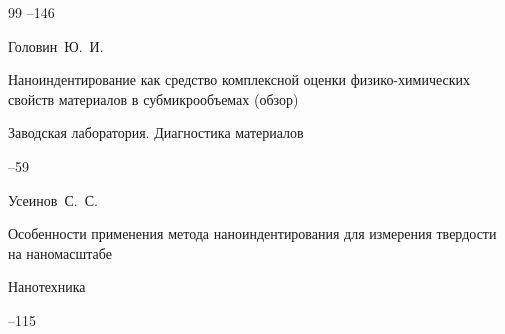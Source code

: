 \begin{thebibliography}{99}
--146















\by Головин~Ю.~И.

\paper Наноиндентирование как средство комплексной оценки физико-химических свойств материалов в субмикрообъемах (обзор)

\jour Заводская лаборатория. Диагностика материалов 




--59















\by Усеинов~С.~С. 

\paper Особенности применения метода наноиндентирования для измерения твердости на наномасштабе  

\jour Нанотехника



--115


\end{thebibliography}
